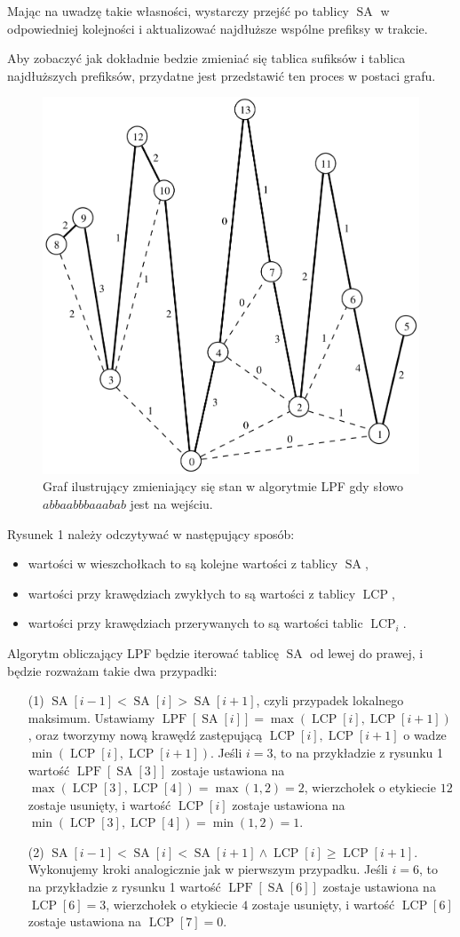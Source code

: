 \documentclass[a4paper,12pt]{article}
\theoremstyle{definition}
\DeclareMathOperator{\SA}{SA}
\DeclareMathOperator{\LCP}{LCP}
\DeclareMathOperator{\LPF}{LPF}
\begin{document}
Mając na uwadzę takie własności, wystarczy przejść po tablicy $\SA$ w odpowiedniej kolejności 
 i aktualizować najdłuższe wspólne prefiksy w trakcie.

Aby zobaczyć jak dokładnie bedzie zmieniać się tablica sufiksów i tablica najdłuższych prefiksów,
 przydatne jest przedstawić ten proces w postaci grafu.

\begin{figure}[h!]
  \center
  \includegraphics[width=0.6\linewidth]{graph}
  \caption{Graf ilustrujący zmieniający się stan w algorytmie LPF gdy słowo $abbaabbbaaabab$ jest na wejściu.}
\end{figure}

Rysunek 1 należy odczytywać w następujący sposób:
\begin{itemize}
\item wartości w wieszchołkach to są kolejne wartości z tablicy $\SA$,
\item wartości przy krawędziach zwykłych to są wartości z tablicy $\LCP$,
\item wartości przy krawędziach przerywanych to są wartości tablic $\LCP_{i}$.
\end{itemize}

Algorytm obliczający LPF będzie iterować tablicę $\SA$ od lewej do prawej,
 i będzie rozważam takie dwa przypadki:

\begin{enumerate}
\item[(1)] $\SA[i - 1] < \SA[i] > \SA[i + 1]$, czyli przypadek lokalnego maksimum.
  Ustawiamy $\LPF[\SA[i]] = \max(\LCP[i], \LCP[i + 1])$, oraz
  tworzymy nową krawędź zastępującą $\LCP[i], \LCP[i + 1]$ o wadze $\min(\LCP[i], \LCP[i + 1])$.
  Jeśli $i = 3$, to na przykładzie z rysunku 1
  wartość $\LPF[\SA[3]]$ zostaje ustawiona na $\max(\LCP[3], \LCP[4]) = \max(1, 2) = 2$,
  wierzchołek o etykiecie $12$ zostaje usunięty,
  i wartość $\LCP[i]$ zostaje ustawiona na $\min(\LCP[3], \LCP[4]) = \min(1, 2) = 1$.
\item[(2)] $\SA[i - 1] < \SA[i] < \SA[i + 1] \land \LCP[i] \geq \LCP[i + 1]$.
  Wykonujemy kroki analogicznie jak w pierwszym przypadku.
  Jeśli $i = 6$, to na przykładzie z rysunku 1
  wartość $\LPF[\SA[6]]$ zostaje ustawiona na $\LCP[6] = 3$,
  wierzchołek o etykiecie $4$ zostaje usunięty,
  i wartość $\LCP[6]$ zostaje ustawiona na $\LCP[7] = 0$.
\end{enumerate}
\end{document}
